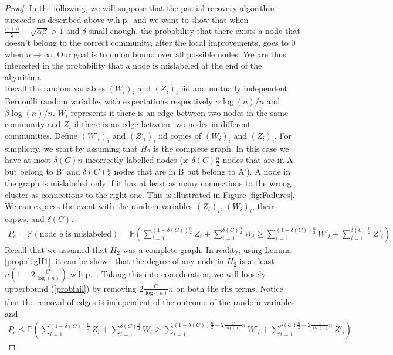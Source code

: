 \documentclass[english]{article}
\newcommand{\1}{\textbf{1}}
\newcommand{\p}{\mathbb{P}}
\begin{document}
\begin{proof}
In the following, we will suppose that the partial recovery algorithm succeeds as described above w.h.p.\  and we want to show that when $\frac{\alpha+\beta}{2}-\sqrt{\alpha \beta} > 1$ and $\delta$ small enough, the probability that there exists a node that doesn't belong to the correct community, after the local improvements, goes to 0 when $n \rightarrow \infty$. Our goal is to union bound over all possible nodes. We are thus interested in the probability that a node is mislabeled at the end of the algorithm.\\



Recall the random variables $(W_i)_i$ and $(Z_i)_i$ iid and mutually independent Bernoulli random variables with expectations respectively $\alpha \log(n)/n$ and $\beta \log(n)/n$. $W_i$ represents if there is an edge between two nodes in the same community and $Z_i$ if there is an edge between two nodes in different communities. Define $(W'_i)_i$ and $(Z'_i)_i$ iid copies of $(W_i)_i$ and $(Z_i)_i$. For simplicity, we start by assuming that $H_2$ is the complete graph. In this case we have at most $\delta(C)n$ incorrectly labelled nodes (ie $\delta(C) \frac{n}{2}$ nodes that are in A but belong to B' and $\delta(C) \frac{n}{2}$ nodes that are in B but belong to A'). A node in the graph is mislabeled only if it has at least as many connections to the wrong cluster as connections to the right one. This is illustrated in Figure \ref{fig:Failures}. We can express the event with the random variables $(Z_i)_i$, $(W_i)_i$, their copies, and $\delta(C)$.
\begin{align}
P_e = \p(\text{node e is mislabeled}) = \p \left( \sum_{i=1}^{(1-\delta(C))\frac{n}{2}} Z_i +\sum_{i=1}^{\delta(C)\frac{n}{2}}W_i \geq  \sum_{i=1}^{(1-\delta(C))\frac{n}{2}} W'_i +\sum_{i=1}^{\delta(C)\frac{n}{2}}Z'_i \right) \label{probfail}
\end{align}
Recall that we assumed that $H_2$ was a complete graph. In reality, using Lemma \ref{prop:degH1}, it can be shown that the degree of any node in $H_2$ is at least $n \left( 1-2 \frac{C}{\log(n)} \right)$ w.h.p.\ . Taking this into consideration, we will loosely upperbound (\ref{probfail}) by removing $2\frac{C}{\log(n)}n$ on both the rhs terms. Notice that the removal of edges is independent of the outcome of the random variables and
\begin{align}
P_e \leq \p \left( \sum_{i=1}^{(1-\delta(C))\frac{n}{2}} Z_i +\sum_{i=1}^{\delta(C)\frac{n}{2}}W_i \geq  \sum_{i=1}^{(1-\delta(C))\frac{n}{2} - 2 \frac{C}{\log(n)}n} W'_i +\sum_{i=1}^{\delta(C)\frac{n}{2} - 2 \frac{C}{\log(n)}n}Z'_i \right) \label{looseprobfail}

\end{align}
\end{proof}
\end{document}
